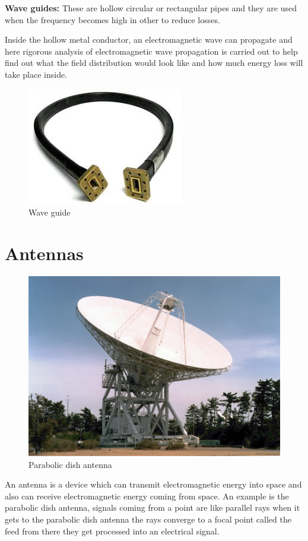 \textbf{Wave guides:} These are hollow circular or rectangular pipes and they are used when the frequency becomes high in other to reduce losses. 

Inside the hollow metal conductor, an electromagnetic wave can propagate and here rigorous analysis of electromagnetic wave propagation is carried out to help find out what the field distribution would look like and how much energy loss will take place inside.
\begin{figure}[h]
\centering
\includegraphics[scale=0.4]{./graphics/waveguide2}
\caption{Wave guide}
\end{figure}

\section{Antennas}
\begin{figure}[h]
\centering
\includegraphics[scale=0.4]{./graphics/spcaceantenna}
\caption{Parabolic dish antenna}
\end{figure}
An antenna is a device which can transmit electromagnetic energy into space and also can receive electromagnetic energy coming from space. An example is the parabolic dish antenna, signals coming from a point are like parallel rays when it gets to the parabolic dish antenna the rays converge to a focal point called the feed from there they get processed into an electrical signal.\\

